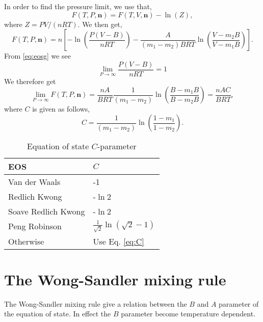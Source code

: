 \documentclass[english]{../thermomemo/thermomemo}
\newcommand*{\vektor}[1]{\boldsymbol{#1}}%
\begin{document}
In order to find the pressure limit, we use that,
\begin{equation}
  F(T,P,\vektor{n}) = F(T,V,\vektor{n}) - \ln(Z),
\end{equation}
where $Z=PV/(nRT)$. We then get,
\begin{equation}
  F(T,P,\vektor{n})=
  n\left[-\ln\left(\frac{P\left(V-B\right)}{nRT}\right)-\frac{A}{\left(m_1-m_2\right)BRT}\ln\left(\frac{V-m_2B}{V-m_1B}\right)
  \right].
\end{equation} 
From \ref{eq:eosg} we see
\begin{equation}
\lim_{P\to\infty} \frac{P\left(V-B\right)}{nRT} = 1
\label{eq:plim}
\end{equation}
We therefore get
\begin{equation}
  \lim_{P\to\infty} F(T,P,\vektor{n})=
  \frac{nA}{BRT}
  \frac{1}{\left(m_1-m_2\right)}\ln\left(\frac{B-m_1B}{B-m_2B}\right)
  = \frac{nAC}{BRT},
  \label{eq:plimF}
\end{equation}
where $C$ is given as follows,
\begin{equation}
  C=
  \frac{1}{\left(m_1-m_2\right)}\ln\left(\frac{1-m_1}{1-m_2}\right).
  \label{eq:C}
\end{equation}
 
\begin{table}[htb]
\caption{Equation of state $C$-parameter}
\center
\begin{tabular}{ll}
  \hline
  EOS &         $C$   \\
  \hline
  Van der Waals		& -1 \\
  Redlich Kwong	 	& -$\ln{2}$ \\
  Soave Redlich Kwong	& -$\ln{2}$ \\
  Peng Robinson	        &
  $\frac{1}{\sqrt{2}}\ln{\left(\sqrt{2}-1\right)}$ \\
  Otherwise             & Use Eq. \ref{eq:C} \\
  \hline
\end{tabular}
\label{tab:C}
\end{table}

\section{The Wong-Sandler mixing rule}
The Wong-Sandler mixing rule give a relation between the $B$ and $A$
parameter of the equation of state. In effect the $B$ parameter become
temperature dependent.
\end{document}
